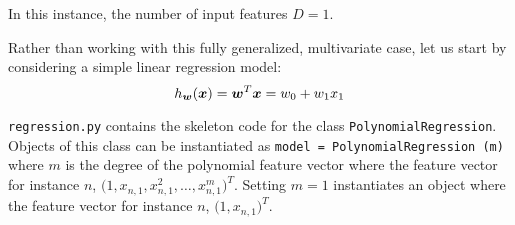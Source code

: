 \documentclass[11pt]{article}
\begin{document}
In this instance, the number of input features $D=1$. 

Rather than working with this fully generalized, multivariate case, let us start by considering a simple linear regression model:
\begin{equation*}
h_{\boldsymbol{w}}(\boldsymbol{x}) = \boldsymbol{w}^T \boldsymbol{x} = w_0 + w_1 x_1
\end{equation*}


\verb|regression.py| contains the skeleton code for the class \verb|PolynomialRegression|. Objects of this class can be instantiated as \verb|model = PolynomialRegression (m)| where $m$ is the degree of the polynomial feature vector where the feature vector for instance $n$, $\bigl( 1, x_{n,1}, x_{n,1}^2, \ldots, x_{n,1}^{m} \bigr)^T$. Setting $m=1$ instantiates an object where the feature vector for instance $n$, $\bigl( 1, x_{n,1}\bigr)^T$. 
\end{document}
